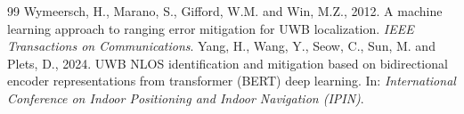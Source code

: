 \documentclass[11pt,a4paper]{article}
\begin{document}
\begin{thebibliography}{99}
 Wymeersch, H., Marano, S., Gifford, W.M. and Win, M.Z., 2012. A machine learning approach to ranging error mitigation for UWB localization. \emph{IEEE Transactions on Communications}.
 Yang, H., Wang, Y., Seow, C., Sun, M. and Plets, D., 2024. UWB NLOS identification and mitigation based on bidirectional encoder representations from transformer (BERT) deep learning. In: \emph{International Conference on Indoor Positioning and Indoor Navigation (IPIN)}.
\end{thebibliography}
\end{document}
